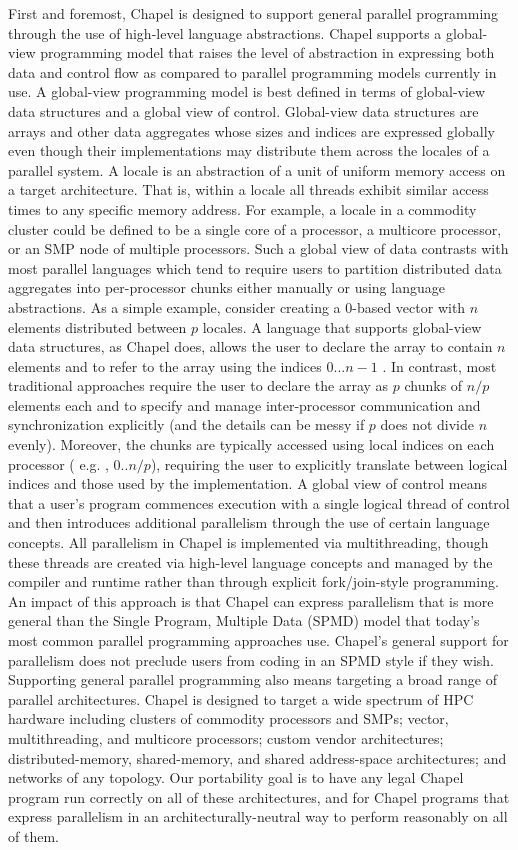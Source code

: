 \documentclass[letterpaper]{article}
\begin{document}
First and foremost, Chapel is designed to support general parallel programming through the use of high-level language abstractions. Chapel supports a global-view programming model
that raises the level of abstraction in expressing both data and control flow as compared to parallel programming models currently in use. A global-view programming model is best defined in terms of
global-view data structures and a global view of control. Global-view data structures are arrays and other data aggregates whose sizes and indices are expressed globally even though their implementations may distribute them across the locales of a parallel system. A locale is an abstraction of a unit of uniform memory access on a target architecture. That is, within a locale all threads exhibit similar access times to any specific memory address. For example, a locale in a commodity cluster could be defined to be a single core of a processor, a multicore processor, or an SMP node of multiple processors. Such a global view of data contrasts with most parallel languages which tend to require users to partition distributed data aggregates into per-processor chunks either manually or using language abstractions. As a simple example, consider creating a $0$-based vector with $n$ elements distributed between $p$ locales. A language that supports global-view data structures, as Chapel does, allows the user to declare the array to contain $n$ elements and to refer to the array using the indices $0 . . . n−1$ . In contrast, most traditional approaches require the user to declare the array as $p$ chunks of $n/p$ elements each and to specify and manage inter-processor communication and synchronization explicitly (and the details can be messy if $p$ does not divide $n$ evenly). Moreover, the chunks are typically accessed using local indices on each processor ( e.g. , $0..n/p$), requiring the user to explicitly translate between logical indices and those used by the implementation. A global view of control means that a user’s program commences execution with a single logical thread of control and then introduces additional parallelism through the use of certain language concepts. All parallelism in Chapel is implemented via multithreading, though these threads are created via high-level language concepts and managed by the compiler and runtime rather than through explicit fork/join-style programming. An impact of this approach is that Chapel can express parallelism that is more general than the Single Program, Multiple Data (SPMD) model that today's most common parallel programming approaches use. Chapel’s general support for parallelism does not preclude users from coding in an SPMD style if they wish. Supporting general parallel programming also means targeting a broad range of parallel architectures. Chapel is designed to target a wide spectrum of HPC hardware including clusters of commodity processors and SMPs; vector, multithreading, and multicore processors; custom vendor architectures; distributed-memory, shared-memory, and shared address-space architectures; and networks of any topology. Our portability goal is to have any legal Chapel program run correctly on all of these architectures, and for Chapel programs that express parallelism in an architecturally-neutral way to perform reasonably on all of them. 
\end{document}
